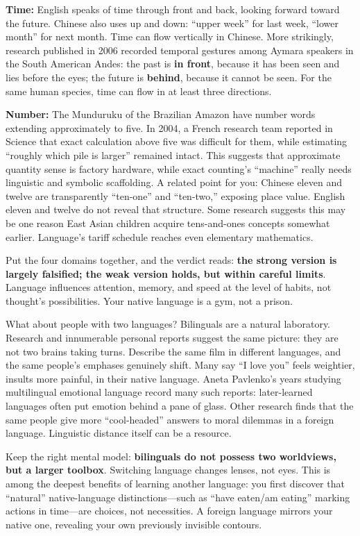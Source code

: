 \textbf{Time:} English speaks of time through front and back, looking forward toward the future. Chinese also uses up and down: ``upper week'' for last week, ``lower month'' for next month. Time can flow vertically in Chinese. More strikingly, research published in 2006 recorded temporal gestures among Aymara speakers in the South American Andes: the past is \textbf{in front}, because it has been seen and lies before the eyes; the future is \textbf{behind}, because it cannot be seen. For the same human species, time can flow in at least three directions.

\textbf{Number:} The Munduruku of the Brazilian Amazon have number words extending approximately to five. In 2004, a French research team reported in Science that exact calculation above five was difficult for them, while estimating ``roughly which pile is larger'' remained intact. This suggests that approximate quantity sense is factory hardware, while exact counting's ``machine'' really needs linguistic and symbolic scaffolding. A related point for you: Chinese eleven and twelve are transparently ``ten-one'' and ``ten-two,'' exposing place value. English eleven and twelve do not reveal that structure. Some research suggests this may be one reason East Asian children acquire tens-and-ones concepts somewhat earlier. Language's tariff schedule reaches even elementary mathematics.

Put the four domains together, and the verdict reads: \textbf{the strong version is largely falsified; the weak version holds, but within careful limits}. Language influences attention, memory, and speed at the level of habits, not thought's possibilities. Your native language is a gym, not a prison.

What about people with two languages? Bilinguals are a natural laboratory. Research and innumerable personal reports suggest the same picture: they are not two brains taking turns. Describe the same film in different languages, and the same people's emphases genuinely shift. Many say ``I love you'' feels weightier, insults more painful, in their native language. Aneta Pavlenko's years studying multilingual emotional language record many such reports: later-learned languages often put emotion behind a pane of glass. Other research finds that the same people give more ``cool-headed'' answers to moral dilemmas in a foreign language. Linguistic distance itself can be a resource.

Keep the right mental model: \textbf{bilinguals do not possess two worldviews, but a larger toolbox}. Switching language changes lenses, not eyes. This is among the deepest benefits of learning another language: you first discover that ``natural'' native-language distinctions---such as ``have eaten/am eating'' marking actions in time---are choices, not necessities. A foreign language mirrors your native one, revealing your own previously invisible contours.


